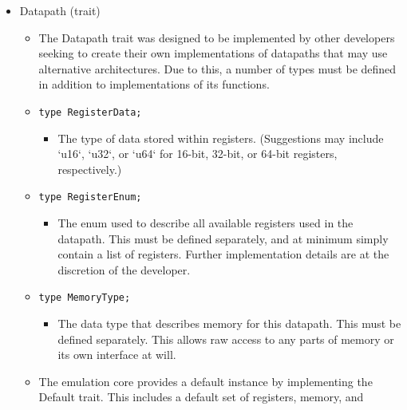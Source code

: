 \documentclass[
    paper=letter,
    parskip=half,
    fontsize=12pt,
    titlepage=firstiscover,
    toc=bibliography,
    numbers=endperiod
]{scrartcl}
\providecommand{\tightlist}{%
  \setlength{\itemsep}{0pt}\setlength{\parskip}{0pt}}
\begin{document}
\begin{itemize}
    \tightlist
    \item Datapath (trait)
          \begin{itemize}
              \tightlist
              \item The Datapath trait was designed to be implemented by other developers
                    seeking to create their own implementations of datapaths that may use
                    alternative architectures. Due to this, a number of types must be
                    defined in addition to implementations of its functions.
              \item \texttt{type RegisterData;}
                    \begin{itemize}
                        \tightlist
                        \item The type of data stored within registers. (Suggestions may include
                              `u16`, `u32`, or `u64` for 16-bit, 32-bit, or 64-bit registers,
                              respectively.)
                    \end{itemize}
              \item \texttt{type RegisterEnum;}
                    \begin{itemize}
                        \tightlist
                        \item The enum used to describe all available registers used in the datapath.
                              This must be defined separately, and at minimum simply contain a list of
                              registers. Further implementation details are at the discretion of the
                              developer.
                    \end{itemize}
              \item \texttt{type MemoryType;}
                    \begin{itemize}
                        \tightlist
                        \item The data type that describes memory for this datapath. This must be
                              defined separately. This allows raw access to any parts of memory or its
                              own interface at will.
                    \end{itemize}
              \item The emulation core provides a default instance by implementing the
                    Default trait. This includes a default set of registers, memory, and

\end{itemize}
\end{itemize}
\end{document}
